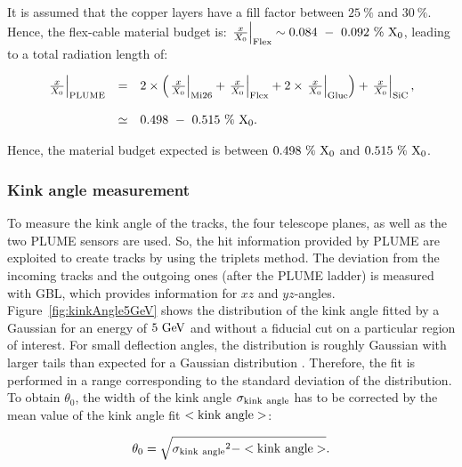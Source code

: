      It is assumed that the copper layers have a fill factor between $25~\%$ and $30~\%$.
     Hence, the flex-cable material budget is: $\left. \frac{x}{X_0} \right|_{\rm{Flex}} \sim 0.084~-~0.092~\%~\rm{X_0}$, leading to a total radiation length of:

     \begin{equation}
       \begin{array}{lcl}
         \left. \frac{x}{X_0} \right|_{\rm{PLUME}} & = & 2 \times \left( \left. \frac{x}{X_0} \right|_{\rm{Mi26}} + \left. \frac{x}{X_0} \right|_{\rm{Flex}} + 2 \times \left. \frac{x}{X_0} \right|_{\rm{Glue}}\right) + \left. \frac{x}{X_0} \right|_{\rm{SiC}}, \\
         \\
         & \simeq & 0.498~-~0.515~\%~\rm{X_0}.
       \end{array}
       \label{eq:X0_theory}
     \end{equation}

     Hence, the material budget expected is between $0.498~\%~\rm{X_0}$ and $0.515~\%~\rm{X_0}$.

     \subsubsection{Kink angle measurement}

   To measure the kink angle of the tracks, the four telescope planes, as well as the two \gls{PLUME} sensors are used.
   So, the hit information provided by \gls{PLUME} are exploited to create tracks by using the triplets method.
   The deviation from the incoming tracks and the outgoing ones (after the \gls{PLUME} ladder) is measured with \gls{GBL}, which provides information for $xz$ and $yz$-angles.
   Figure~\ref{fig:kinkAngle5GeV} shows the distribution of the kink angle fitted by a Gaussian for an energy of $5~\rm{GeV}$ and without a fiducial cut on a particular region of interest.
   For small deflection angles, the distribution is roughly Gaussian with larger tails than expected for a Gaussian distribution \cite{Agashe:2014kda}.
   Therefore, the fit is performed in a range corresponding to the standard deviation of the distribution.
   To obtain $\theta_0$, the width of the kink angle $\rm{\sigma_{kink~angle}}$ has to be corrected by the mean value of the kink angle fit $<\rm{kink~angle}>$:
   
   \begin{equation}
     \theta_0 = \sqrt{\rm{\sigma_{kink~angle}}^2 - <\rm{kink~angle}>}.
     \label{eq:kink}
   \end{equation}
   
